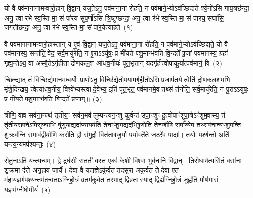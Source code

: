 {\anuvakamend[{वी॒र इषꣳ॑ ह॒व्यमु॒षसो॑ मरुतश्च॒ वृष्टिं॒ भग॑स्य॒ द्वाद॑श च}]}%

{}

\setcounter{anuvakam}{0}
यो वै पव॑मानानामन्वारो॒हान् वि॒द्वान् यज॒ते\-ऽनु॒ पव॑माना॒ना रो॑हति॒ न पव॑माने॒भ्यो\-ऽव॑च्छिद्यते श्ये॒नो॑\-ऽसि गाय॒त्रछ॑न्दा॒ अनु॒ त्वा र॑भे स्व॒स्ति मा॒ सं पा॑रय सुप॒र्णो॑\-ऽसि त्रि॒ष्टुप्छ॑न्दा॒ अनु॒ त्वा र॑भे स्व॒स्ति मा॒ सं पा॑रय॒ सघा॑सि॒ जग॑तीछन्दा॒ अनु॒ त्वा र॑भे स्व॒स्ति मा॒ सं पा॑र॒येत्या॑है॒ते~(१)

वै पव॑मानानामन्वारो॒हास्तान् य ए॒वं वि॒द्वान् यज॒ते\-ऽनु॒ पव॑माना॒ना रो॑हति॒ न पव॑माने॒भ्यो\-ऽव॑च्छिद्यते॒ यो वै पव॑मानस्य॒ सन्त॑तिं॒ वेद॒ सर्व॒मायु॑रेति॒ न पु॒राऽऽयु॑षः॒ प्र मी॑यते पशु॒मान्भ॑वति वि॒न्दते᳚ प्र॒जां पव॑मानस्य॒ ग्रहा॑ गृह्य॒न्ते\-ऽथ॒ वा अ॑स्यै॒ते\-ऽगृ॑हीता द्रोणकल॒श आ॑धव॒नीयः॑ पूत॒भृत्तान् यदगृ॑हीत्वोपाकु॒र्यात्पव॑मानं॒ वि~(२)

च्छि॑न्द्या॒त् तं वि॒च्छिद्य॑मानमध्व॒र्योः प्रा॒णो\-ऽनु॒ विच्छि॑द्येतोप\-या॒मगृ॑हीतो\-ऽसि प्र॒जा\-प॑तये॒ त्वेति॑ द्रोणकल॒शम॒भि मृ॑शे॒दिन्द्रा॑य॒ त्वेत्या॑धव॒नीयं॒ विश्वे᳚भ्यस्त्वा दे॒वेभ्य॒ इति॑ पूत॒भृतं॒ पव॑मानमे॒व तथ्सं त॑नोति॒ सर्व॒मायु॑रेति॒ न पु॒राऽऽयु॑षः॒ प्र मी॑यते पशु॒मान्भ॑वति वि॒न्दते᳚ प्र॒जाम्॥~(३)

{\anuvakamend[{ए॒ते वि द्विच॑त्वारिꣳशच्च}]}%

त्रीणि॒ वाव सव॑ना॒न्यथ॑ तृ॒तीय॒ꣳ॒ सव॑न॒मव॑ लुम्पन्त्यन॒ꣳ॒शु कु॒र्वन्त॑ उपा॒ꣳ॒शुꣳ हु॒त्वोपाꣳ॑शुपा॒त्रे\-ऽꣳ॑शुम॒वास्य॒ तं तृ॑तीयसव॒ने॑\-ऽपि॒सृज्या॒भि षु॑णुया॒द्यदा᳚प्या॒यय॑ति॒ तेनाꣳ॑शु॒मद्यद॑भिषु॒णोति॒ तेन॑र्जी॒षि सर्वा᳚ण्ये॒व तथ्सव॑नान्यꣳशु॒मन्ति॑ शु॒क्रव॑न्ति स॒माव॑द्वीर्याणि करोति॒ द्वौ स॑मु॒द्रौ वित॑तावजू॒र्यौ प॒र्याव॑र्तेते ज॒ठरे॑व॒ पादाः᳚। तयोः॒ पश्य॑न्तो॒ अति॑ यन्त्य॒न्यमप॑श्यन्तः॒~(४)

सेतु॒नाऽति॑ यन्त्य॒न्यम्। द्वे द्रध॑सी स॒तती॑ वस्त॒ एकः॑ के॒शी विश्वा॒ भुव॑नानि वि॒द्वान्। ति॒रो॒धायै॒त्यसि॑तं॒ वसा॑नः शु॒क्रमा द॑त्ते अनु॒हाय॑ जा॒र्यै। दे॒वा वै यद्य॒ज्ञे\-ऽकु॑र्वत॒ तदसु॑रा अकुर्वत॒ ते दे॒वा ए॒तं म॑हाय॒ज्ञम॑पश्य॒न्तम॑तन्वता\-ऽ\-ग्निहो॒त्रं व्र॒तम॑कुर्वत॒ तस्मा॒द् द्विव्र॑तः स्या॒द् द्विर्\mbox{}ह्य॑ग्निहो॒त्रं जुह्व॑ति पौर्णमा॒सं य॒ज्ञम॑ग्नीषो॒मीयं॑~(५)

